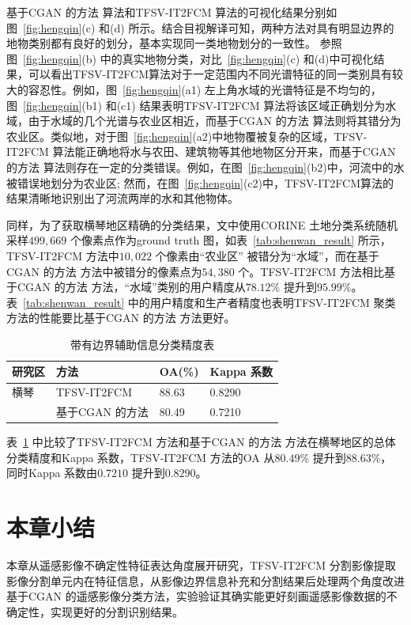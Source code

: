 基于CGAN 的方法 算法和TFSV-IT2FCM 算法的可视化结果分别如图~\ref{fig:hengqin}(c) 和(d) 所示。结合目视解译可知，两种方法对具有明显边界的地物类别都有良好的划分，基本实现同一类地物划分的一致性。 参照图~\ref{fig:hengqin}(b) 中的真实地物分类，对比~\ref{fig:hengqin}(c) 和(d)中可视化结果，可以看出TFSV-IT2FCM算法对于一定范围内不同光谱特征的同一类别具有较大的容忍性。例如，图~\ref{fig:hengqin}(a1) 左上角水域的光谱特征是不均匀的，图~\ref{fig:hengqin}(b1) 和(c1) 结果表明TFSV-IT2FCM 算法将该区域正确划分为水域，由于水域的几个光谱与农业区相近，而基于CGAN 的方法 算法则将其错分为农业区。类似地，对于图~\ref{fig:hengqin}(a2)中地物覆被复杂的区域，TFSV-IT2FCM 算法能正确地将水与农田、建筑物等其他地物区分开来，而基于CGAN 的方法 算法则存在一定的分类错误。例如，在图~\ref{fig:hengqin}(b2)中，河流中的水被错误地划分为农业区; 然而，在图~\ref{fig:hengqin}(c2)中，TFSV-IT2FCM算法的结果清晰地识别出了河流两岸的水和其他物体。



同样，为了获取横琴地区精确的分类结果，文中使用CORINE 土地分类系统随机采样$499,669$ 个像素点作为ground truth 图，如表~\ref{tab:shenwan_result} 所示，TFSV-IT2FCM 方法中$10,022$ 个像素由“农业区” 被错分为“水域”，而在基于CGAN 的方法 方法中被错分的像素点为$54,380$ 个。TFSV-IT2FCM 方法相比基于CGAN 的方法 方法，“水域”类别的用户精度从$78.12\%$ 提升到$95.99\%$。 表~\ref{tab:shenwan_result} 中的用户精度和生产者精度也表明TFSV-IT2FCM 聚类方法的性能要比基于CGAN 的方法 方法更好。

\begin{table}[htbp]
    \caption{带有边界辅助信息分类精度表}\label{tab:hengqin_oa}
    \centering
    \begin{tabular}{llll}
        \toprule
        研究区 & 方法        & OA(\%) & Kappa 系数 \\
        \midrule
        横琴   & TFSV-IT2FCM & 88.63  & 0.8290     \\
               & 基于CGAN 的方法      & 80.49  & 0.7210     \\
        \bottomrule
    \end{tabular}
\end{table}

表~\ref{tab:hengqin_oa} 中比较了TFSV-IT2FCM 方法和基于CGAN 的方法 方法在横琴地区的总体分类精度和Kappa 系数，TFSV-IT2FCM 方法的OA 从$80.49\%$ 提升到$88.63\%$， 同时Kappa 系数由$0.7210$ 提升到$0.8290$。



\section{本章小结}
\label{sec::chap04-6}
本章从遥感影像不确定性特征表达角度展开研究，TFSV-IT2FCM 分割影像提取影像分割单元内在特征信息，从影像边界信息补充和分割结果后处理两个角度改进基于CGAN 的遥感影像分类方法，实验验证其确实能更好刻画遥感影像数据的不确定性，实现更好的分割识别结果。%
